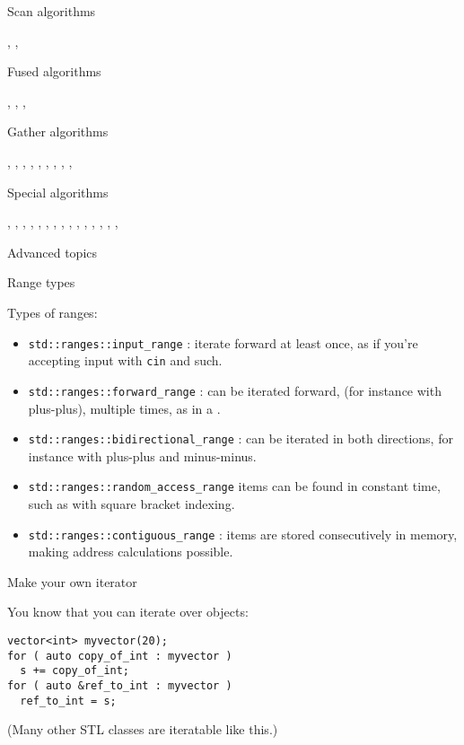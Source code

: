  {Scan algorithms}

,
,

 {Fused algorithms}

,
,
,

 {Gather algorithms}

,
,
,
,
,
,
,
,
,

 {Special algorithms}

,
,
,
,
,
,
,
,
,
,
,
,
,
,
,

 {Advanced topics}

 {Range types}

Types of ranges:
\begin{itemize}
\item \lstinline+std::ranges::input_range+ : iterate forward at least once,
  as if you're accepting input with \lstinline{cin} and such.
\item \lstinline+std::ranges::forward_range+ : can be iterated forward,
  (for instance with plus-plus), multiple times,
  as in a .
\item \lstinline+std::ranges::bidirectional_range+ : can be iterated in both
  directions, for instance with plus-plus and minus-minus.
\item \lstinline+std::ranges::random_access_range+ items can be found
  in constant time, such as with square bracket indexing.
\item \lstinline+std::ranges::contiguous_range+ : items
  are stored consecutively in memory, making address calculations possible.
\end{itemize}

 {Make your own iterator}
\label{sec:range-iter}

You know that you can iterate over  objects:
\begin{lstlisting}
vector<int> myvector(20);
for ( auto copy_of_int : myvector )
  s += copy_of_int;
for ( auto &ref_to_int : myvector )
  ref_to_int = s;
\end{lstlisting}
(Many other \ac{STL} classes are iteratable like this.)

